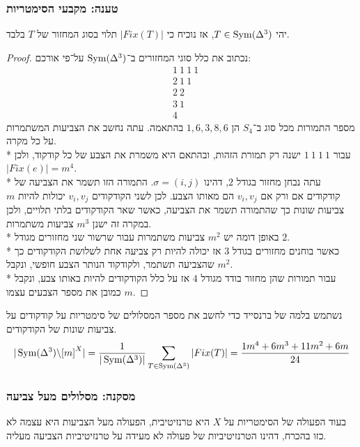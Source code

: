 \subsubsection{טענה: מקבעי הסימטריות}
יהי $T \in \operatorname{Sym}(\Delta^3)$, אז נוכיח כי $|Fix(T)|$ תלוי בסוג המחזור של $T$ בלבד.
\begin{proof}
	נכתוב את כלל סוגי המחזורים ב־$\operatorname{Sym}(\Delta^3)$ על־פי אורכם:
	\begin{align*}
		& 1\ 1\ 1\ 1 \\
		& 2\ 1\ 1 \\
		& 2\ 2 \\
		& 3\ 1 \\
		& 4
	\end{align*}
	מספר התמורות מכל סוג ב־$S_4$ הן $1, 6, 3, 8, 6$ בהתאמה. עתה נחשב את הצביעות המשתמרות על כל מקרה. \\*
	עבור $1\ 1\ 1\ 1$ ישנה רק תמורת הזהות, ובהתאם היא משמרת את הצבע של כל קודקוד, ולכן $|Fix(e)| = m^4$. \\*
	עתה נבחן מחזור בגודל $2$, דהינו $\sigma = (i, j)$. התמורה הזו תשמר את הצביעה של קודקודים אם ורק אם $v_i, v_j$ הם מאותו הצבע.
	לכן לשני הקודקודים $v_i, v_j$ יכולות להיות $m$ צביעות שונות כך שהתמורה תשמר את הצביעה, כאשר שאר הקודקודים בלתי תלויים, ולכן במקרה זה ישנן $m^3$ צביעות משתמרות. \\*
	באופן דומה יש $m^2$ צביעות משתמרות עבור שרשור שני מחזורים מגודל $2$. \\*
	כאשר בוחנים מחזורים בגודל $3$ אז יכולה להיות רק צביעה אחת לשלושת הקודקודים כך שהצביעה תשתמר, ולקודקוד הנותר הצבע חופשי, ונקבל $m^2$. \\*
	עבור תמורות שהן מחזור בודד מגודל $4$ אז על כלל הקודקודים להיות באותו צבע, ונקבל כמובן את מספר הצבעים עצמו $m$.
\end{proof}

נשתמש בלמה של ברנסייד כדי לחשב את מספר המסלולים של סימטריות על קודקודים על צביעות שונות של הקודקודים.
\[
	|\operatorname{Sym}(\Delta^3) \backslash {[m]}^X| = \frac{1}{|\operatorname{Sym}(\Delta^3)|} \sum_{T \in \operatorname{Sym}(\Delta^3)} |Fix(T)| = \frac{1m^4 + 6m^3 + 11m^2 + 6m}{24}
\]

\subsubsection{מסקנה: מסלולים מעל צביעה}
בעוד הפעולה של הסימטריות על $X$ היא טרנזיטיבית, הפעולה מעל הצביעות היא עצמה לא כזו בהכרח, דהינו הטרנזיטיביות של פעולה לא מעידה על טרנזיטיביות הצביעה מעליה.

